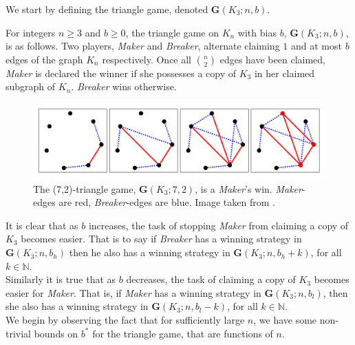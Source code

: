 \documentclass[a4paper,oneside,11pt]{report}
\begin{document}
We start by defining the triangle game, denoted $\textbf{G}(K_3;n,b)$.\\

\begin{definition}

For integers $n \geqslant 3$ and $b \geqslant 0$, the triangle game on $K_n$ with bias $b$, $\textbf{G}(K_3;n,b)$, is as follows. Two players, \textit{Maker} and \textit{\textit{Breaker}}, alternate claiming $1$ and at most $b$ edges of the graph $K_n$ respectively. Once all $\binom{n}{2}$ edges have been claimed, \textit{Maker} is declared the winner if she possesses a copy of $K_3$ in her claimed subgraph of $K_n$. \textit{\textit{Breaker}} wins otherwise.

\end{definition}

\begin{figure}
    \centering
    \includegraphics[width=14cm]{Maker Breaker image.png}
    \caption{The (7,2)-triangle game, $\textbf{G}(K_3;7,2)$, is a \textit{Maker}'s win. \textit{Maker}-edges are red, \textit{Breaker}-edges are blue. Image taken from \cite{glazik2022new}.}
    \label{fig:my_label}
\end{figure}

It is clear that as $b$ increases, the task of stopping \textit{Maker} from claiming a copy of $K_3$ becomes easier. That is to say if \textit{Breaker} has a winning strategy in $\textbf{G}(K_3;n,b_h)$ then he also has a winning strategy in $\textbf{G}(K_3;n,b_h+k)$, for all $k \in \mathbb{N}$. \\

Similarly it is true that as $b$ decreases, the task of claiming a copy of $K_3$ becomes easier for \textit{Maker}. That is, if \textit{Maker} has a winning strategy in $\textbf{G}(K_3;n,b_l)$, then she also has a winning strategy in $\textbf{G}(K_3;n,b_l-k)$, for all $k \in \mathbb{N}$.\\

We begin by observing the fact that for sufficiently large $n$, we have some non-trivial bounds on $b^*$ for the triangle game, that are functions of $n$.\\
\end{document}
